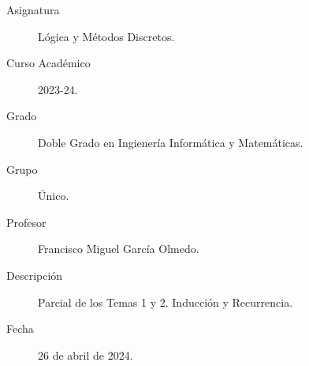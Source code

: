 \documentclass[12pt]{article}
\begin{document}

    
    

    \begin{description}
        \item[Asignatura] Lógica y Métodos Discretos.
        \item[Curso Académico] 2023-24.
        \item[Grado] Doble Grado en Ingienería Informática y Matemáticas.
        \item[Grupo] Único.
        \item[Profesor] Francisco Miguel García Olmedo.
        \item[Descripción] Parcial de los Temas 1 y 2. Inducción y Recurrencia.
        \item[Fecha] 26 de abril de 2024.
    
    \end{description}
    \newpage
    
\end{document}
